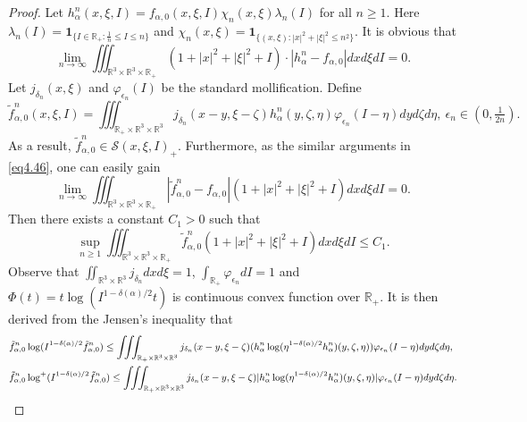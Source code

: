 \documentclass[reqno,11pt]{amsart}
\numberwithin{equation}{section}
\def\R{\mathbb{R}}
\begin{document}
\begin{proof}
 Let $h^n_\alpha (x,\xi ,I ) = f_{\alpha,0 } (x,\xi ,I )  \chi_n (x,\xi ) \lambda_n (I)$ for all $n \geq 1$. Here $\lambda_n (I) = \mathbf{1}_{ \{ I \in \R_+ : \frac{1}{n} \leq I \leq n \} } $ and $\chi_n (x, \xi) = \mathbf{1}_{ \{ (x,\xi) : |x|^2+ |\xi|^2 \leq n^2 \} } $. It is obvious that
	\begin{equation}\label{hn-f}
		\lim \limits_{n\rightarrow \infty}  \iiint_{\R^3 \times \R^3 \times \R_+ } (1+|x|^2 +|\xi|^2+I) \cdot |h^n_\alpha - f_{\alpha,0 }| dxd\xi dI=0.
	\end{equation}
	Let $j_{\delta_n} (x, \xi) $ and $ \varphi_{\epsilon_n} (I)$ be the standard mollification. Define
	\begin{equation*}
		\tilde{f}^n_{\alpha,0 } (x,\xi ,I ) = \iiint_{\R_+ \times \R^3 \times \R^3 } j_{\delta_n } (x-y, \xi - \zeta ) h^n_\alpha (y,\zeta , \eta )  \varphi_{\epsilon_n } (I -\eta ) d y d \zeta d \eta ,\ \epsilon_n \in (0,\tfrac{1}{2n}).
	\end{equation*}
	As a result, $\tilde{f}^n_{\alpha,0 } \in \mathscr{S} (x,\xi ,I )_+$. Furthermore, as the similar arguments in \eqref{eq4.46}, one can easily gain
	\begin{equation}\label{fnt-f}
		\lim \limits_{n\rightarrow \infty } \iiint_{\R^3 \times \R^3 \times \R_+ } |\tilde{f}^n_{\alpha,0 } -f_{\alpha,0 } | (1+|x|^2 + |\xi|^2 + I ) dxd\xi dI =0.
	\end{equation}
	Then there exists a constant $C_1 > 0$ such that  
	\begin{equation}\label{fn-bd}
		\sup \limits_{n\geq 1 } \iiint_{\R^3 \times \R^3 \times \R_+ } \tilde{f}^n_{\alpha,0 } (1+|x|^2 + |\xi|^2 + I) dxd\xi dI \leq C_1 .
	\end{equation}
Observe that $\iint_{\R^3 \times \R^3 } j_{\delta_n} dxd\xi =1$, $\int_{\R_+} \varphi_{\epsilon_n} dI =1$ and $ \Phi (t) = t\log ( I^{1 - \delta (\alpha) /2} t ) $ is continuous convex function over $\R_+$. It is then derived from the Jensen's inequality that
	\begin{equation*}{\small
		\begin{aligned}
			&\tilde{f}^n_{\alpha,0 } \log ( I^{1 - \delta (\alpha) /2} \tilde{f}^n_{\alpha,0 } ) \leq \iiint_{\R_+ \times \R^3 \times \R^3 } j_{\delta_n } (x-y, \xi - \zeta ) ( h^n_\alpha \log ( \eta^{1 - \delta (\alpha) /2} h^n_\alpha ) (y,\zeta , \eta )) \varphi_{\epsilon_n } (I -\eta ) d y d \zeta d \eta, \\
			&\tilde{f}^n_{\alpha,0 } \log ^+ ( I^{1 - \delta (\alpha) /2} \tilde{f}^n_{\alpha,0 } ) \leq \iiint_{\R_+ \times \R^3 \times \R^3 } j_{\delta_n } (x-y, \xi - \zeta ) | h^n_\alpha \log ( \eta^{1 - \delta (\alpha) /2} h^n_\alpha ) (y,\zeta , \eta )| \varphi_{\epsilon_n } (I -\eta ) d y d \zeta d \eta.

\end{aligned}}
\end{equation*}
\end{proof}
\end{document}
